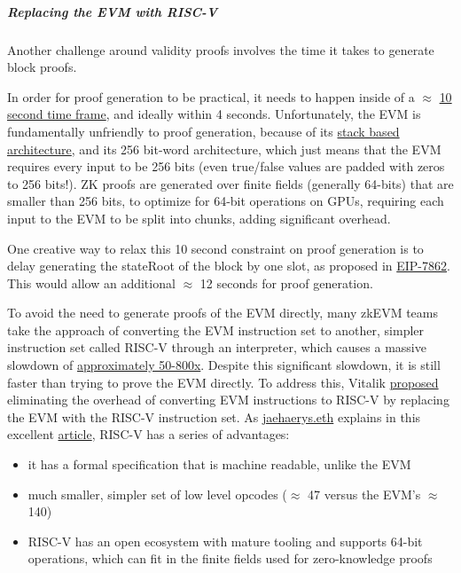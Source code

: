 \documentclass[12pt]{article}
\begin{document}
\subparagraph{Replacing the EVM with RISC-V} Another challenge around validity proofs involves the time it takes to generate block proofs. 

In order for proof generation to be practical, it needs to happen inside of a $\approx$ \href{https://blog.ethereum.org/2025/07/10/realtime-proving#:~:text=With%20the%20current%20slot%20time%20of%2012%20seconds%20and%20maximum%20time%20to%20propagate%20data%20across%20the%20network%20of%20~1.5%20seconds%2C%20realtime%20means%2010%20seconds%20or%20less.}{10 second time frame}, and ideally within 4 seconds. Unfortunately, the EVM is fundamentally unfriendly to proof generation, because of its \href{https://faizannehal.medium.com/understanding-the-stack-based-architecture-of-evm-af45dc9819f2}{stack based architecture}, and its 256 bit-word architecture, which just means that the EVM requires every input to be 256 bits (even true/false values are padded with zeros to 256 bits!). ZK proofs are generated over finite fields (generally 64-bits) that are smaller than 256 bits, to optimize for 64-bit operations on GPUs, requiring each input to the EVM to be split into chunks, adding significant overhead. 

One creative way to relax this 10 second constraint on proof generation is to delay generating the stateRoot of the block by one slot, as proposed in \href{https://eips.ethereum.org/EIPS/eip-7862}{EIP-7862}. This would allow an additional $\approx$ 12 seconds for proof generation. 

To avoid the need to generate proofs of the EVM directly, many zkEVM teams take the approach of converting the EVM instruction set to another, simpler instruction set called RISC-V through an interpreter, which causes a massive slowdown of \href{https://x.com/pumatheuma/status/1915541516128600348}{approximately 50-800x}. Despite this significant slowdown, it is still faster than trying to prove the EVM directly. To address this, Vitalik \href{https://ethereum-magicians.org/t/long-term-l1-execution-layer-proposal-replace-the-evm-with-risc-v/23617}{proposed} eliminating the overhead of converting EVM instructions to RISC-V by replacing the EVM with the RISC-V instruction set. As \href{https://x.com/0xJaehaerys}{jaehaerys.eth} explains in this excellent \href{https://x.com/0xJaehaerys/status/1960051628129865918}{article}, RISC-V has a series of advantages: 

\begin{itemize}
    \item it has a formal specification that is machine readable, unlike the EVM
    \item much smaller, simpler set of low level opcodes ($\approx$ 47 versus the EVM's $\approx$ 140) 
    \item RISC-V has an open ecosystem with mature tooling and supports 64-bit operations, which can fit in the finite fields used for zero-knowledge proofs
\end{itemize} 
\end{document}
